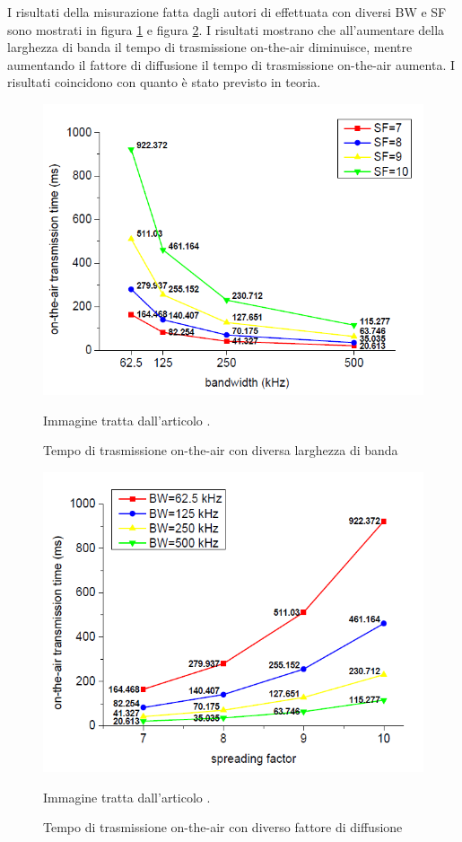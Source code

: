 \documentclass[a4paper]{report} %
\begin{document}
I risultati della misurazione fatta dagli autori di \cite{art:rif.44} effettuata con diversi BW e SF sono mostrati in figura \ref{fig:toa} e figura \ref{fig:toasf}. I risultati mostrano che all'aumentare della larghezza di banda il tempo di trasmissione on-the-air diminuisce, mentre aumentando il fattore di diffusione il tempo di trasmissione on-the-air aumenta. I risultati coincidono con quanto è stato previsto in teoria.
\begin{figure}
	\centering
	\includegraphics[scale=.5]{Immagini/r1.png}
	
	\caption{Tempo di trasmissione on-the-air con diversa larghezza di banda}
	\label{fig:toa}
	Immagine tratta dall'articolo \cite{art:rif.44}.
\end{figure}

\begin{figure}
	\centering
	\includegraphics[scale=.5]{Immagini/r2.png}
	
	\caption{Tempo di trasmissione on-the-air con diverso fattore di diffusione}
	\label{fig:toasf}
	Immagine tratta dall'articolo \cite{art:rif.44}.
\end{figure}
\end{document}
